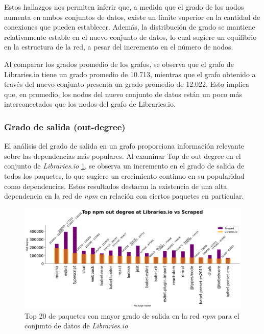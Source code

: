 Estos hallazgos nos permiten inferir que, a medida que el grado de los nodos aumenta en ambos conjuntos de datos,
existe un límite superior en la cantidad de conexiones que pueden establecer. Además, la distribución
de grado se mantiene relativamente estable en el nuevo conjunto de datos, lo cual sugiere un equilibrio
en la estructura de la red, a pesar del incremento en el número de nodos.

Al comparar los grados promedio de los grafos, se observa que el grafo de Libraries.io tiene un grado promedio de 10.713,
mientras que el grafo obtenido a través del nuevo conjunto presenta un grado promedio de 12.022. Esto implica que, en promedio,
los nodos del nuevo conjunto de datos están un poco más interconectados que los nodos del grafo de Libraries.io.



\subsubsection{Grado de salida (out-degree)}

El análisis del grado de salida en un grafo proporciona información relevante sobre las dependencias más populares.
Al examinar Top de out degree en el conjunto de \textit{Libraries.io} \ref{fig:npm_outd_libraries}, se observa un incremento en el grado de salida de todos los paquetes,
lo que sugiere un crecimiento continuo en su popularidad como dependencias. Estos resultados destacan la existencia de
una alta dependencia en la red de \textit{npm} en relación con ciertos paquetes en particular.

\begin{figure}[ht!]
    \begin{center}
        \includegraphics[width=1\textwidth]{img/npm/outd-ls.png}
        \caption{Top 20 de paquetes con mayor grado de salida en la red \textit{npm} para el conjunto de datos de \textit{Libraries.io}}
    \end{center}
    \label{fig:npm_outd_libraries}
\end{figure}

